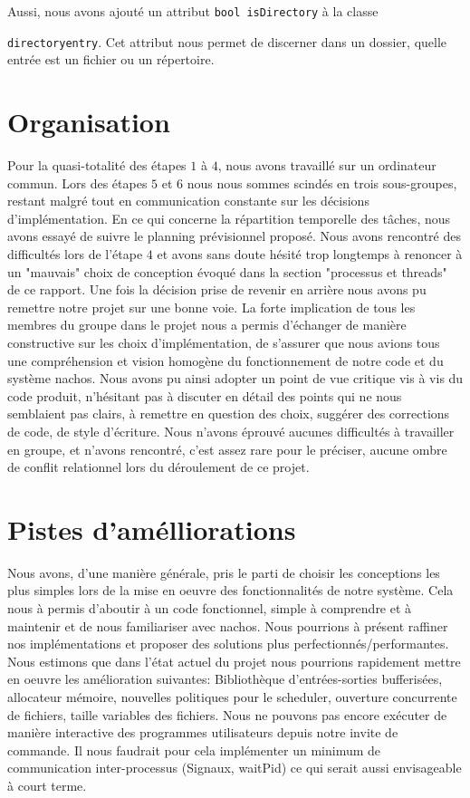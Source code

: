 \documentclass[11pt]{article}
\theoremstyle{definition}
\theoremstyle{definition}
\begin{document}
Aussi, nous avons ajouté un attribut \texttt{bool isDirectory} à la classe

\texttt{directoryentry}. Cet attribut nous permet de discerner dans un dossier, quelle entrée est un fichier ou un répertoire.

\section{Organisation}
Pour la quasi-totalité des étapes $1$ à $4$, nous avons travaillé sur un ordinateur commun.
Lors des étapes $5$ et $6$ nous nous sommes scindés en trois sous-groupes, restant malgré tout en communication constante sur les décisions d'implémentation. En ce qui concerne la répartition temporelle des tâches, nous avons essayé de suivre le planning prévisionnel proposé. Nous avons rencontré des difficultés lors de l'étape $4$ et avons sans doute hésité trop longtemps à renoncer à un "mauvais" choix de conception évoqué dans la section "processus et threads" de ce rapport. Une fois la décision prise de revenir en arrière nous avons pu remettre notre projet sur une bonne voie.
La forte implication de tous les membres du groupe dans le projet nous a permis d'échanger de manière constructive sur les choix d'implémentation, de s'assurer que nous avions tous une compréhension et vision homogène du fonctionnement de notre code et du système nachos. Nous avons pu ainsi adopter un point de vue critique vis à vis du code produit, n'hésitant pas à discuter en détail des points qui ne nous semblaient pas clairs, à remettre en question des choix,
suggérer des corrections de code, de style d'écriture. Nous n'avons éprouvé aucunes difficultés à travailler en groupe, et n'avons rencontré, c'est assez rare pour le préciser, aucune ombre de conflit relationnel lors du déroulement de ce projet.

\section{Pistes d'amélliorations}
Nous avons, d'une manière générale, pris le parti de choisir les conceptions les plus simples
lors de la mise en oeuvre des fonctionnalités de notre système. Cela nous à permis d'aboutir
à un code fonctionnel, simple à comprendre et à maintenir et de nous familiariser avec nachos.
Nous pourrions à présent raffiner nos implémentations et proposer des solutions plus perfectionnés/performantes.
Nous estimons que dans l'état actuel du projet nous pourrions rapidement mettre en oeuvre les amélioration suivantes:
Bibliothèque d'entrées-sorties bufferisées, allocateur mémoire, nouvelles politiques pour le scheduler, ouverture concurrente de fichiers, taille variables des fichiers.
Nous ne pouvons pas encore exécuter de manière interactive des programmes utilisateurs depuis notre invite de commande. Il nous faudrait pour cela implémenter un minimum de communication inter-processus (Signaux, waitPid) ce qui serait aussi envisageable à court terme.
\end{document}
